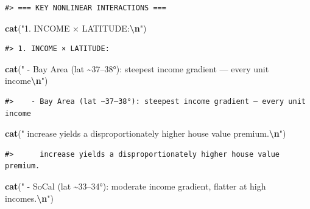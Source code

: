 \documentclass[
]{article}
\newenvironment{Shaded}{\begin{snugshade}}{\end{snugshade}}
\newcommand{\FunctionTok}[1]{\textcolor[rgb]{0.13,0.29,0.53}{\textbf{#1}}}
\newcommand{\NormalTok}[1]{#1}
\newcommand{\SpecialCharTok}[1]{\textcolor[rgb]{0.81,0.36,0.00}{\textbf{#1}}}
\newcommand{\StringTok}[1]{\textcolor[rgb]{0.31,0.60,0.02}{#1}}
\begin{document}
\begin{verbatim}
#> === KEY NONLINEAR INTERACTIONS ===
\end{verbatim}

\begin{Shaded}
\begin{Highlighting}[]
\FunctionTok{cat}\NormalTok{(}\StringTok{"1. INCOME × LATITUDE:}\SpecialCharTok{\textbackslash{}n}\StringTok{"}\NormalTok{)}
\end{Highlighting}
\end{Shaded}

\begin{verbatim}
#> 1. INCOME × LATITUDE:
\end{verbatim}

\begin{Shaded}
\begin{Highlighting}[]
\FunctionTok{cat}\NormalTok{(}\StringTok{"   {-} Bay Area (lat \textasciitilde{}37–38°): steepest income gradient — every unit income}\SpecialCharTok{\textbackslash{}n}\StringTok{"}\NormalTok{)}
\end{Highlighting}
\end{Shaded}

\begin{verbatim}
#>    - Bay Area (lat ~37–38°): steepest income gradient — every unit income
\end{verbatim}

\begin{Shaded}
\begin{Highlighting}[]
\FunctionTok{cat}\NormalTok{(}\StringTok{"     increase yields a disproportionately higher house value premium.}\SpecialCharTok{\textbackslash{}n}\StringTok{"}\NormalTok{)}
\end{Highlighting}
\end{Shaded}

\begin{verbatim}
#>      increase yields a disproportionately higher house value premium.
\end{verbatim}

\begin{Shaded}
\begin{Highlighting}[]
\FunctionTok{cat}\NormalTok{(}\StringTok{"   {-} SoCal (lat \textasciitilde{}33–34°): moderate income gradient, flatter at high incomes.}\SpecialCharTok{\textbackslash{}n}\StringTok{"}\NormalTok{)}
\end{Highlighting}
\end{Shaded}
\end{document}

